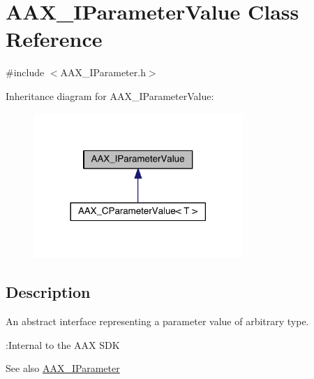 \hypertarget{a00109}{}\section{A\+A\+X\+\_\+\+I\+Parameter\+Value Class Reference}
\label{a00109}


{\ttfamily \#include $<$A\+A\+X\+\_\+\+I\+Parameter.\+h$>$}



Inheritance diagram for A\+A\+X\+\_\+\+I\+Parameter\+Value\+:
\nopagebreak
\begin{figure}[H]
\begin{center}
\leavevmode
\includegraphics[width=225pt]{a00650}
\end{center}
\end{figure}


\subsection{Description}
An abstract interface representing a parameter value of arbitrary type. 

\begin{DoxyRefDesc}{\+:\+Internal to the A\+A\+X S\+D\+K}
\item[\hyperlink{a00006__aax_sdk_internal000001}{\+:\+Internal to the A\+A\+X S\+D\+K}]\end{DoxyRefDesc}


\begin{DoxySeeAlso}{See also}
\hyperlink{a00108}{A\+A\+X\+\_\+\+I\+Parameter} 
\end{DoxySeeAlso}
